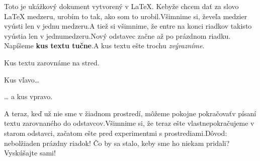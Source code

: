 \documentclass{article}
\begin{document}
Toto je ukážkový dokument vytvorený v \LaTeX . Kebyže chcem dať za slovo \LaTeX{} medzeru, urobím to tak, ako som to urobil.Všimnime si, ževeľa medzier vyústi len v jednu medzeru.A tiež si všimnime, že entre na konci riadkov takisto vyústia len v jednumedzeru.Nový odstavec začne až po prázdnom riadku. Napíšeme \textbf{kus textu tučne}.A kus textu ešte trochu \emph{zvýrazníme}.

\begin{center}
Kus textu zarovnáme na stred.
\end{center}

\begin{flushleft}
Kus vľavo\ldots
\end{flushleft}

\begin{flushright}
\ldots{} a kus vpravo.
\end{flushright}
A teraz, keď už nie sme v žiadnom prostredí, môžeme pokojne pokračovaťv písaní textu zarovnaného do odstavcov.Všimnime si, že teraz ešte vlastnepokračujeme v starom odstavci, začatom ešte pred experimentmi s prostrediami.Dôvod: nebolžiaden prázdny riadok! Čo by sa stalo, keby sme ho niekam pridali?Vyskúšajte sami!
\end{document}
